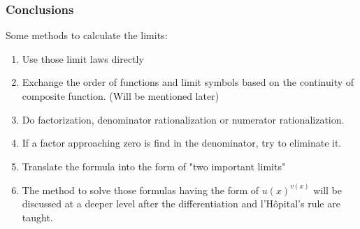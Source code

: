



\begin{frame}
	\frametitle{Conclusions}
	Some methods to calculate the limits:
	\begin{enumerate}
		\item Use those limit laws directly
		\item Exchange the order of functions and limit symbols based on the continuity of composite function. (Will be mentioned later)
		\item Do factorization, denominator rationalization or numerator rationalization.
		\item If a factor approaching zero is find in the denominator, try to eliminate it.
		\item Translate the formula into the form of "two important limits"
		\item \alert{The method to solve those formulas having the form of $u(x)^{v(x)}$ will be discussed at a deeper level after the differentiation and l'Hôpital's rule are taught.}
	\end{enumerate}
\end{frame}






